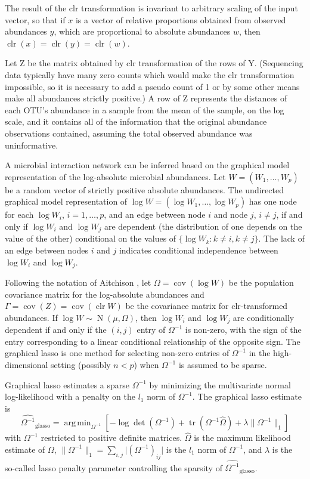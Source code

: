 \documentclass[10pt]{article}
\newcommand{\clr}{\operatorname{clr}}
\newcommand{\N}{\operatorname{N}}
\newcommand{\cov}{\operatorname{cov}}
\DeclareMathOperator*{\argmin}{arg\,min}
\DeclareMathOperator{\tr}{tr}
\begin{document}
The result of the clr transformation is invariant to arbitrary scaling of the input vector, so that if $x$ is a vector of relative proportions obtained from observed abundances $y$, which are proportional to absolute abundances $w$, then $\clr(x) = \clr(y) = \clr(w)$.

Let $\mathrm{Z}$ be the matrix obtained by clr transformation of the rows of $\mathrm{Y}$. (Sequencing data typically have many zero counts which would make the clr transformation impossible, so it is necessary to add a pseudo count of 1 or by some other means make all abundances strictly positive.) A row of $\mathrm{Z}$ represents the distances of each OTU's abundance in a sample from the mean of the sample, on the log scale, and it contains all of the information that the original abundance observations contained, assuming the total observed abundance was uninformative.

A microbial interaction network can be inferred based on the graphical model representation of the log-absolute microbial abundances. Let $W = (W_1, \dots, W_p)$ be a random vector of strictly positive absolute abundances. The undirected graphical model representation of $\log W = (\log W_1, \dots, \log W_p)$ has one node for each $\log W_i$, $i = 1, \dots, p$, and an edge between node $i$ and node $j$, $i \ne j$, if and only if $\log W_i$ and $\log W_j$ are dependent (the distribution of one depends on the value of the other) conditional on the values of $\{\log W_k : k \ne i, k \ne j\}$. The lack of an edge between nodes $i$ and $j$ indicates conditional independence between $\log W_i$ and $\log W_j$.

Following the notation of Aitchison \citeyear{aitchison}, let $\Omega = \cov(\log W)$ be the population covariance matrix for the log-absolute abundances and $\Gamma = \cov(Z) = \cov(\clr W)$ be the covariance matrix for clr-transformed abundances. If $\log W \sim \N(\mu, \Omega)$, then $\log W_i$ and $\log W_j$ are conditionally dependent if and only if the $(i,j)$ entry of $\Omega^{-1}$ is non-zero, with the sign of the entry corresponding to a linear conditional relationship of the opposite sign. The graphical lasso \cite{friedmanjer} is one method for selecting non-zero entries of $\Omega^{-1}$ in the high-dimensional setting (possibly $n < p$) when $\Omega^{-1}$ is assumed to be sparse.

Graphical lasso estimates a sparse $\Omega^{-1}$ by minimizing the multivariate normal log-likelihood with a penalty on the $l_1$ norm of $\Omega^{-1}$. The graphical lasso estimate is
\begin{equation}
\label{e:glasso}
\widehat{\Omega^{-1}}_{\text{glasso}} = \argmin_{\Omega^{-1}} \left[ -\log \det(\Omega^{-1}) + \tr(\Omega^{-1} \hat{\Omega}) + \lambda \lVert \Omega^{-1} \rVert_1 \right]
\end{equation}
with $\Omega^{-1}$ restricted to positive definite matrices. $\hat{\Omega}$ is the maximum likelihood estimate of $\Omega$, $\lVert \Omega^{-1} \rVert_1 = \sum_{i,j} \lvert (\Omega^{-1})_{ij} \rvert$ is the $l_1$ norm of $\Omega^{-1}$, and $\lambda$ is the so-called lasso penalty parameter controlling the sparsity of $\widehat{\Omega^{-1}}_{\text{glasso}}$.
\end{document}
